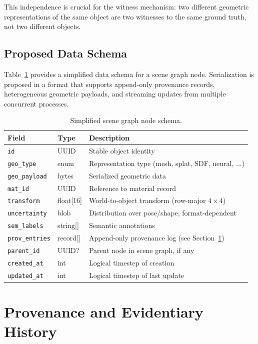\documentclass[11pt,a4paper]{article}
\theoremstyle{plain}
\theoremstyle{definition}
\theoremstyle{remark}
\begin{document}
This independence is crucial for the witness mechanism: two different geometric representations of the same object are two witnesses to the same ground truth, not two different objects.

\subsection{Proposed Data Schema}

Table~\ref{tab:schema} provides a simplified data schema for a scene graph node. Serialization is proposed in a format that supports append-only provenance records, heterogeneous geometric payloads, and streaming updates from multiple concurrent processes.

\begin{table}[h]
\centering
\caption{Simplified scene graph node schema.}
\label{tab:schema}
\begin{tabular}{lll}
\toprule
Field & Type & Description \\
\midrule
\texttt{id} & UUID & Stable object identity \\
\texttt{geo\_type} & enum & Representation type (mesh, splat, SDF, neural, ...) \\
\texttt{geo\_payload} & bytes & Serialized geometric data \\
\texttt{mat\_id} & UUID & Reference to material record \\
\texttt{transform} & float[16] & World-to-object transform (row-major $4\times4$) \\
\texttt{uncertainty} & blob & Distribution over pose/shape, format-dependent \\
\texttt{sem\_labels} & string[] & Semantic annotations \\
\texttt{prov\_entries} & record[] & Append-only provenance log (see Section~\ref{sec:provenance}) \\
\texttt{parent\_id} & UUID? & Parent node in scene graph, if any \\
\texttt{created\_at} & int & Logical timestep of creation \\
\texttt{updated\_at} & int & Logical timestep of last update \\
\bottomrule
\end{tabular}
\end{table}

\section{Provenance and Evidentiary History}
\label{sec:provenance}
\end{document}
